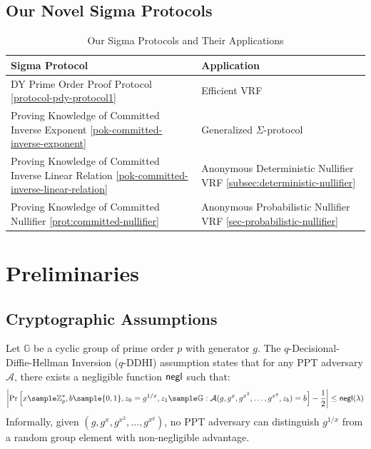 \subsection{Our Novel Sigma Protocols}

\begin{table}[htbp]
\centering
\caption{Our Sigma Protocols and Their Applications}
\label{tab:nullifier-protocols}
\begin{tabular}{p{}|p{}}
\toprule
\textbf{Sigma Protocol} & \textbf{Application} \\
\midrule
DY Prime Order Proof Protocol \ref{protocol-pdy-protocol1} & Efficient VRF \\
\midrule
Proving Knowledge of Committed Inverse Exponent  \ref{pok-committed-inverse-exponent} & Generalized $\Sigma$-protocol \\
\midrule
Proving Knowledge of Committed Inverse Linear Relation \ref{pok-committed-inverse-linear-relation} & Anonymous Deterministic Nullifier VRF \ref{subsec:deterministic-nullifier}\\
\midrule
Proving Knowledge of Committed Nullifier \ref{prot:committed-nullifier} & Anonymous Probabilistic Nullifier VRF \ref{sec-probabilistic-nullifier} \\
\bottomrule
\end{tabular}
\end{table}




\section{Preliminaries}\label{sec-vrf-preliminaries}

\subsection{Cryptographic Assumptions}

\begin{definition}
Let $\mathbb{G}$ be a cyclic group of prime order $p$ with generator $g$. The $q$-Decisional-Diffie-Hellman Inversion ($q$-DDHI) \cite{mitsunari_new_2002} assumption states that for any PPT adversary $\mathcal{A}$, there exists a negligible function $\mathsf{negl}$ such that:
\[
\left|\Pr\left[ x \sample \Zp^*, b \sample \{0,1\}, z_0 = g^{1/x}, z_1 \sample \G : \mathcal{A}(g, g^x, g^{x^2}, \ldots, g^{x^q}, z_b) = b \right] - \frac{1}{2}\right| \leq \negl(\lambda)
\]
Informally, given $(g, g^x, g^{x^2}, \ldots, g^{x^q})$, no PPT adversary can distinguish $g^{1/x}$ from a random group element with non-negligible advantage.
\end{definition}

